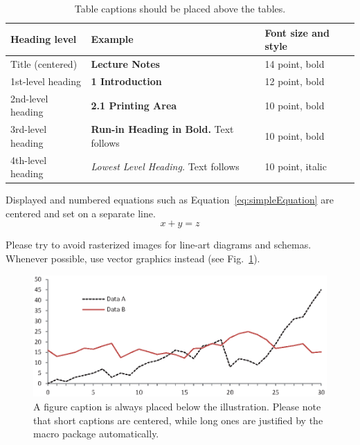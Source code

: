 \documentclass{llncs}
\begin{document}
\begin{table}
\caption{Table captions should be placed above the
tables.}\label{tab1}
\begin{center}
\begin{tabular}{ l l l }
\toprule
Heading level &  Example & Font size and style\\
\midrule
Title (centered) &  {\Large\bfseries Lecture Notes} & 14 point, bold\\
1st-level heading &  {\large\bfseries 1 Introduction} & 12 point, bold\\
2nd-level heading & {\bfseries 2.1 Printing Area} & 10 point, bold\\
3rd-level heading & {\bfseries Run-in Heading in Bold.} Text follows & 10 point, bold\\
4th-level heading & {\itshape Lowest Level Heading.} Text follows & 10 point, italic\\
\bottomrule
\end{tabular}
\end{center}
\end{table}



Displayed and numbered equations such as Equation~\ref{eq:simpleEquation} are centered and set on a separate line.
\begin{equation}
\label{eq:simpleEquation}
x + y = z
\end{equation}

Please try to avoid rasterized images for line-art diagrams and
schemas. Whenever possible, use vector graphics instead (see
Fig.~\ref{fig1}).

\begin{figure}
\includegraphics[width=\textwidth]{fig1.eps}
\caption{A figure caption is always placed below the illustration.
Please note that short captions are centered, while long ones are
justified by the macro package automatically.} \label{fig1}
\end{figure}
\end{document}
